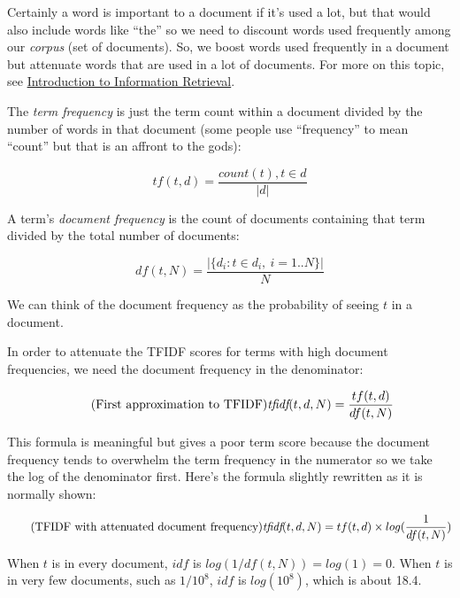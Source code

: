 \begin{fullwidth}
Certainly a word is important to a document if it's used a lot, but that would also include words like ``the'' so we need to discount words used frequently among our {\em corpus} (set of documents). So, we boost words used frequently in a document but attenuate words that are used  in a lot of documents.  For more on this topic, see \href{http://nlp.stanford.edu/IR-book/html/htmledition/term-frequency-and-weighting-1.html}{Introduction to Information Retrieval}.

The {\em term frequency} is just the term count within a document divided by the number of words in that document (some people use ``frequency'' to mean ``count'' but that is an affront to the gods):

\[\tag{Term frequency of term $t$, document $d$}
tf(t,d) = \frac{count(t), t \in d}{|d|}
\]

A term's {\em document frequency} is the count of documents containing that term divided by the total number of documents:

\[\tag{Document frequency of $t$ in $N$ documents}
df(t,N) = \frac{|\{d_i : t \in d_i, \ i = 1..N\}|}{N}
\]

\noindent We can think of the document frequency as the probability of seeing $t$ in a document.

In order to attenuate the TFIDF scores for terms with high document frequencies, we need the document frequency  in the denominator:

\[\tag{First approximation to TFIDF}
\text{\em tfidf}(t,d,N) = \frac{tf(t,d)}{df(t,N)}
\]

This formula is  meaningful but gives a poor term score because the document frequency tends to overwhelm the term frequency in the numerator so we take the log of the denominator first.  Here's the formula slightly rewritten as it is normally shown:

\[\tag{TFIDF with attenuated document frequency}
\text{\em tfidf}(t,d,N) = tf(t,d) \times log(\frac{1}{df(t,N)})
\]

\noindent When $t$ is in every document, $idf$ is $log(1/df(t,N)) = log(1) = 0$. When $t$ is in very few documents, such as $1/10^8$, $idf$ is $log(10^8)$, which is about 18.4.

\begin{center}
\end{center}
\end{fullwidth}
